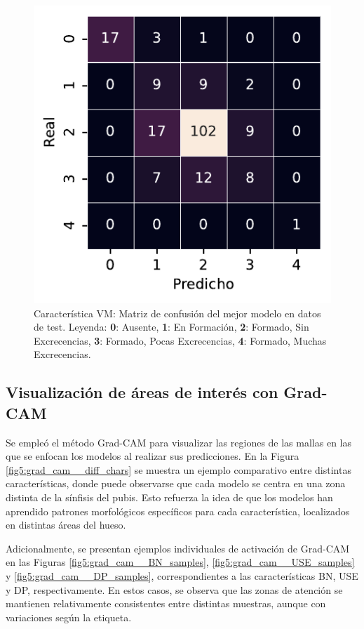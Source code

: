 \begin{figure}[htbp]
    \vspace{1.5em} %

    \includegraphics[width=0.6\linewidth]{figures/5_experiments/single-vm-cm.pdf}
    \caption[Característica VM: Matriz de confusión del mejor modelo en datos de test.]{Característica VM: Matriz de confusión del mejor modelo en datos de test. Leyenda: \textbf{0}: Ausente, \textbf{1}: En Formación, \textbf{2}: Formado, Sin Excrecencias, \textbf{3}: Formado, Pocas Excrecencias, \textbf{4}: Formado, Muchas Excrecencias.}
    \label{fig5:VM_confusion_matrix}
\end{figure}

\FloatBarrier

\subsection{Visualización de áreas de interés con Grad-CAM}

Se empleó el método Grad-CAM para visualizar las regiones de las mallas en las que se enfocan los modelos al realizar sus predicciones. En la Figura \ref{fig5:grad_cam__diff_chars} se muestra un ejemplo comparativo entre distintas características, donde puede observarse que cada modelo se centra en una zona distinta de la sínfisis del pubis. Esto refuerza la idea de que los modelos han aprendido patrones morfológicos específicos para cada característica, localizados en distintas áreas del hueso. 

Adicionalmente, se presentan ejemplos individuales de activación de Grad-CAM en las Figuras \ref{fig5:grad_cam__BN_samples}, \ref{fig5:grad_cam__USE_samples} y \ref{fig5:grad_cam__DP_samples}, correspondientes a las características BN, USE y DP, respectivamente. En estos casos, se observa que las zonas de atención se mantienen relativamente consistentes entre distintas muestras, aunque con variaciones según la etiqueta.

